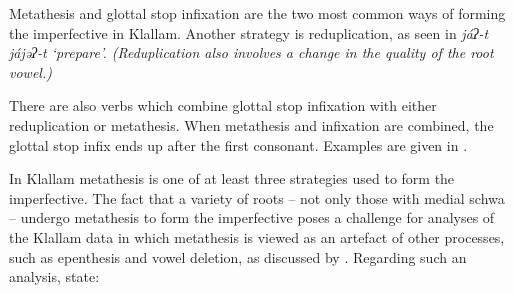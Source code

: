 \newpage
\begin{exe}
	\label{ex:KlaC1VC->C1VqC}
\end{exe}

Metathesis and glottal stop infixation
are the two most common ways of forming the imperfective in Klallam.
Another strategy is reduplication,
as seen in \it{jáʔ-t} {\ra} \it{jájəʔ-t} `prepare'.
(Reduplication also involves a change in the quality of the root vowel.)

There are also verbs which combine glottal stop infixation with
either reduplication or metathesis.
When metathesis and infixation are combined,
the glottal stop infix ends up after the first consonant.
Examples are given in .

\begin{exe}
	\label{ex:KlaCVC->CqCV}
\end{exe}

In Klallam metathesis is one of at least three
strategies used to form the imperfective.
The fact that a variety of roots -- not only those with medial schwa --
undergo metathesis to form the imperfective
poses a challenge for analyses of the Klallam data
in which metathesis is viewed as an artefact of
other processes, such as epenthesis and vowel deletion,
as discussed by \cite[540]{blga98}.
Regarding such an analysis, \cite[217]{thth69} state:

